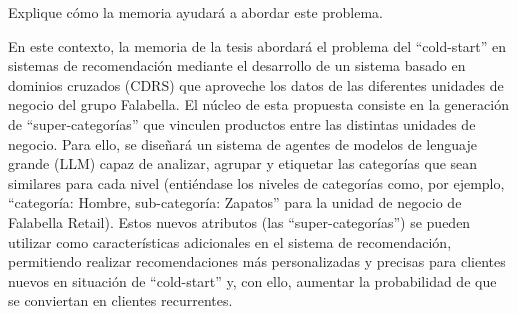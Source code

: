 Explique cómo la memoria ayudará a abordar este problema.

En este contexto, la memoria de la tesis abordará el problema del \enquote{cold-start} en sistemas de recomendación mediante el desarrollo de un sistema basado en dominios cruzados (CDRS) que aproveche los datos de las diferentes unidades de negocio del grupo Falabella. El núcleo de esta propuesta consiste en la generación de \enquote{super-categorías} que vinculen productos entre las distintas unidades de negocio. Para ello, se diseñará un sistema de agentes de modelos de lenguaje grande (LLM) capaz de analizar, agrupar y etiquetar las categorías que sean similares para cada nivel (entiéndase los niveles de categorías como, por ejemplo, \enquote{categoría: Hombre, sub-categoría: Zapatos} para la unidad de negocio de Falabella Retail). Estos nuevos atributos (las \enquote{super-categorías}) se pueden utilizar como características adicionales en el sistema de recomendación, permitiendo realizar recomendaciones más personalizadas y precisas para clientes nuevos en situación de \enquote{cold-start} y, con ello, aumentar la probabilidad de que se conviertan en clientes recurrentes.